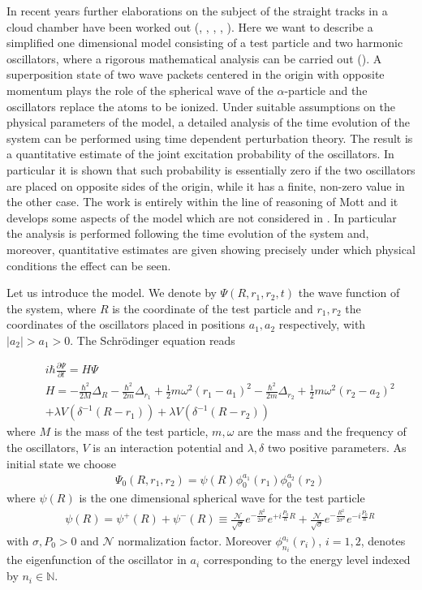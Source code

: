 \documentclass[12pt,reqno]{amsart}
\newcommand{\natu}{\mathbb{N}}
\newcommand{\n}{\relax}
\newcommand{\vs}{\medskip}
\newcommand{\f}{\frac}
\newcommand{\ba}{\begin{eqnarray}}
\newcommand{\ea}{\end{eqnarray}}
\numberwithin{equation}{section}
\begin{document}
\vs
\n
In recent years further elaborations on  the subject of the straight tracks in a cloud chamber  have been worked out (\cite{p}, \cite{br}, \cite{ccf}, \cite{cl}, \cite{ha}). Here we want to describe a simplified one dimensional model consisting of a test particle and two harmonic oscillators, where a rigorous mathematical analysis can be carried out (\cite{dft}). A superposition state of two wave packets centered in the origin with opposite momentum plays the role of the spherical wave of the $\alpha$-particle and the oscillators replace the atoms to be ionized.  Under suitable assumptions on the physical parameters of the model, a detailed analysis of the time evolution of the system can be performed using time dependent perturbation theory. The result is  a quantitative  estimate of the joint excitation probability of the oscillators. In particular it is shown   that such probability is essentially zero if the two oscillators 
are placed on  opposite sides of the origin, while it has a finite, non-zero value in the other case.  
The work is entirely within the line of reasoning of Mott and it develops  some aspects of the model which are not considered in \cite{m}.  In particular the analysis is performed following the time evolution of the system and, moreover, quantitative estimates are given showing precisely under which physical conditions the effect can be seen. 

\n
Let us introduce the model. We denote by $\Psi(R,r_1,r_2,t)$ the wave function of the system, where $R$ is the coordinate of the test particle and $r_1, r_2$ the coordinates of the oscillators placed in positions $a_1, a_2$ respectively, with $|a_2|>a_1>0$. The Schr\"{o}dinger equation reads 



\ba
&&i \hbar \f{\partial \Psi}{\partial t} = H \Psi \label{eq}\\
&&H= -\f{\hbar^2}{2M} \Delta_R \! -\! \f{\hbar^2}{2m} \Delta_{r_1} \! +\!\f{1}{2}m \omega^2 (r_1 \!-\! a_1)^2 \!-\! \f{\hbar^2}{2m} \Delta_{r_2} \!+\!\f{1}{2}m \omega^2 (r_2\! -\! a_2)^2 \label{H_0}\nonumber\\
&&+ \lambda V(\delta^{-1}(R-r_1)) + \lambda V(\delta^{-1}(R-r_2)) \label{H_1}
\ea
where $M$ is the mass of the test particle, $m, \omega$ are the mass and the frequency of the oscillators, $V$ is an interaction potential and $\lambda , \delta $ two positive parameters. As initial state  we choose 
\ba
&&  \Psi_0(R,r_1,r_2)= \psi(R) \phi^{a_1}_{0} (r_1) \phi^{a_2}_{0}(r_2) \label{statoin}
\ea
where  $\psi(R)$ is the one dimensional spherical wave for the test  particle
\ba
&&\psi(R)= \psi^{+}(R) + \psi^{-}(R)  \equiv    \f{\mathcal{N}}{\sqrt{\sigma}} e^{- \f{R^2}{2 \sigma^2}} e^{+ i \f{P_0}{\hbar} R}    +    \f{\mathcal{N}}{\sqrt{\sigma}} e^{- \f{R^2}{2 \sigma^2}} e^{- i \f{P_0}{\hbar} R} \label{p}
\ea
with $\sigma, P_0 >0$ and $\mathcal{N}$ normalization factor. Moreover $\phi_{n_i}^{a_i} (r_i)$, $i=1,2$, denotes the eigenfunction of the oscillator in $a_i$ corresponding to the energy level indexed by $n_i \in \natu$. 
\end{document}
